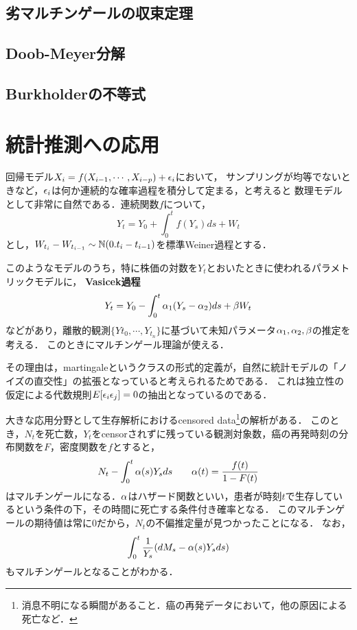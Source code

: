 \documentclass[uplatex,dvipdfmx]{jsreport}
\begin{document}
\subsection{劣マルチンゲールの収束定理}

\subsection{Doob-Meyer分解}

\subsection{Burkholderの不等式}

\section{統計推測への応用}

回帰モデル$X_i=f(X_{i-1},\cdots,X_{i-p})+\epsilon_i$において，
サンプリングが均等でないときなど，$\epsilon_i$は何か連続的な確率過程を積分して定まる，と考えると
数理モデルとして非常に自然である．連続関数$f$について，
\[Y_t=Y_0+\int^t_0f(Y_s)ds+W_t\]
とし，$W_{t_i}-W_{t_{i-1}}\sim\mathbb{N}(0.t_i-t_{i-1})$を標準Weiner過程とする．

このようなモデルのうち，特に株価の対数を$Y_t$とおいたときに使われるパラメトリックモデルに，
\textbf{Vasicek過程}
\[Y_t=Y_0-\int^t_0\alpha_1(Y_s-\alpha_2)ds+\beta W_t\]
などがあり，離散的観測$\{Y{t_0},\cdots,Y_{t_n}\}$に基づいて未知パラメータ$\alpha_1,\alpha_2,\beta$の推定を考える．
このときにマルチンゲール理論が使える．

その理由は，martingaleというクラスの形式的定義が，自然に統計モデルの「ノイズの直交性」の拡張となっていると考えられるためである．
これは独立性の仮定による代数規則$E[\epsilon_i\epsilon_j]=0$の抽出となっているのである．

大きな応用分野として生存解析におけるcensored data\footnote{消息不明になる瞬間があること．癌の再発データにおいて，他の原因による死亡など．}の解析がある．
このとき，$N_t$を死亡数，$Y_t$をcensorされずに残っている観測対象数，癌の再発時刻の分布関数を$F$，密度関数を$f$とすると，
\[N_t-\int^t_0\alpha(s)Y_sds\qquad\alpha(t)=\frac{f(t)}{1-F(t)}\]
はマルチンゲールになる．$\alpha$はハザード関数といい，患者が時刻$t$で生存しているという条件の下，その時間に死亡する条件付き確率となる．
このマルチンゲールの期待値は常に$0$だから，$N_t$の不偏推定量が見つかったことになる．
なお，
\[\int^t_0\frac{1}{Y_s}(dM_s-\alpha(s)Y_sds)\]
もマルチンゲールとなることがわかる．
\end{document}
